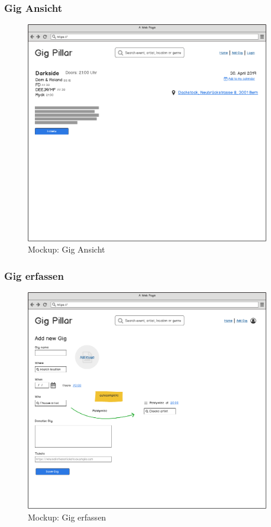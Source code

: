 \clearpage
\subsubsection{Gig Ansicht}

\begin{figure}[!htb]
  \centering
  \includegraphics[width=0.95\textwidth]{mockups/event.png}
  \caption{Mockup: Gig Ansicht}
\end{figure}

\clearpage
\subsubsection{Gig erfassen}

\begin{figure}[!htb]
  \centering
  \includegraphics[width=0.95\textwidth]{mockups/add-gig.png}
  \caption{Mockup: Gig erfassen}
\end{figure}

